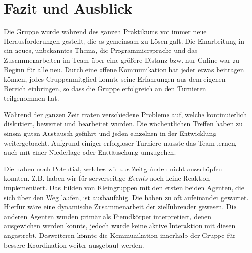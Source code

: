\section{Fazit und Ausblick}

Die Gruppe wurde während des ganzen Praktikums vor immer neue Herausforderungen gestellt, die es gemeinsam zu Lösen galt. Die Einarbeitung in ein neues, unbekanntes Thema, die Programmiersprache und das Zusammenarbeiten im Team über eine größere Distanz bzw. nur Online war zu Beginn für alle neu. Durch eine offene Kommunikation hat jeder etwas beitragen können, jedes Gruppenmitglied konnte seine Erfahrungen aus dem eigenen Bereich einbringen, so dass die Gruppe erfolgreich an den Turnieren teilgenommen hat. \newline

Während der ganzen Zeit traten verschiedene Probleme auf, welche kontinuierlich diskutiert, bewertet und bearbeitet wurden. Die wöchentlichen Treffen haben zu einem guten Austausch geführt und jeden einzelnen in der Entwicklung weitergebracht. Aufgrund einiger erfolgloser Turniere musste das Team lernen, auch mit einer Niederlage oder Enttäuschung umzugehen. \newline

Die \Agents haben noch Potential, welches wir aus Zeitgründen nicht ausschöpfen konnten. Z.B. haben wir für serverseitige \textit{Events} noch keine Reaktion implementiert. Das Bilden von Kleingruppen mit den ersten beiden Agenten, die sich über den Weg laufen, ist ausbaufähig. Die \Agents haben zu oft aufeinander gewartet. Hierfür wäre eine dynamische Zusammenarbeit der \Agents zielführender  gewesen. Die anderen Agenten wurden primär als Fremdkörper interpretiert, denen ausgewichen werden konnte, jedoch wurde keine aktive Interaktion mit diesen angestrebt. Desweiteren könnte die Kommunikation innerhalb der Gruppe für bessere Koordination weiter ausgebaut werden. 

